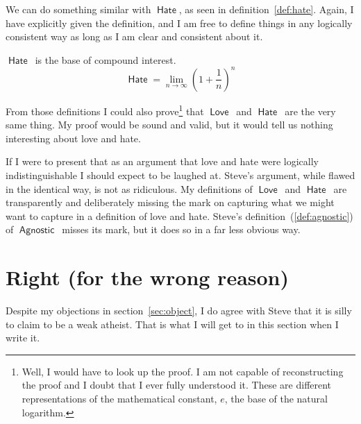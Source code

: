 \documentclass[12pt]{article}
\newcommand{\rel}[1]{\ensuremath{\mathop{\mathsf{#1}}}}
\newcommand{\rlagno}{\rel{Agnostic}}
\newcommand{\rllove}{\rel{Love}}
\newcommand{\rlhate}{\rel{Hate}}
\begin{document}
We can do something similar with \rlhate, as seen in definition~\ref{def:hate}.
Again, I have explicitly given the definition, and I am free to define things in any logically consistent way as long as I am clear and consistent about it.

\begin{definition}\label{def:hate}
    \rlhate\ is the base of compound interest.
    \[
     \rlhate =  \lim_{n \to \infty}\left( 1 + \frac{1}{n}\right)^n 
    \]   
\end{definition}

From those definitions I could also prove\footnote{%
    Well, I would have to look up the proof.
    I am not capable of reconstructing the proof and I doubt that I ever fully understood it.
    These are different representations of the mathematical constant,
    $e$, the base of the natural logarithm.}
that \rllove\ and \rlhate\ are the very same thing.
My proof would be sound and valid, but it would tell us nothing interesting about love and hate.

If I were to present that as an argument that love and hate were logically indistinguishable I should expect to be laughed at.
Steve's argument, while flawed in the identical way, is not as ridiculous.
My definitions of \rllove\ and \rlhate\ are transparently and deliberately missing the mark on capturing what we might want to capture in a definition of love and hate.
Steve's definition~(\ref{def:agnostic}) of \rlagno\ misses its mark,
but it does so in a far less obvious way.

\section{Right (for the wrong reason)}

Despite my objections in section~\ref{sec:object}, I do agree with Steve that it is silly to claim to be a weak atheist. That is what I will get to in this section when I write it.
\end{document}
